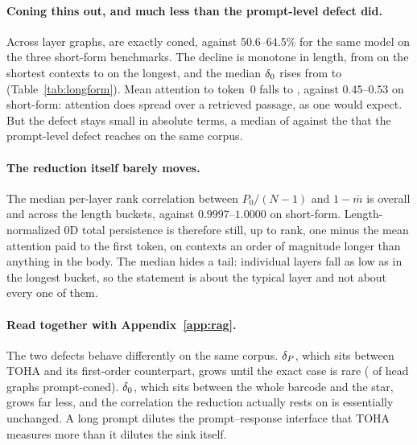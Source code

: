 \paragraph{Coning thins out, and much less than the prompt-level defect did.} Across \LongCells{} layer graphs, \LongConed{} are exactly coned, against \mbox{50.6--64.5\%} for the same model on the three short-form benchmarks. The decline is monotone in length, from \LongConedHi{} on the shortest contexts to \LongConedLo{} on the longest, and the median $\delta_0$ rises from \LongDefectLo{} to \LongDefectHi{} (Table~\ref{tab:longform}). Mean attention to token~0 falls to \LongSink{}, against $0.45$--$0.53$ on short-form: attention does spread over a retrieved passage, as one would expect. But the defect stays small in absolute terms, a median of \LongMedDefect{} against the \RagMedDefect{} that the prompt-level defect reaches on the same corpus.

\paragraph{The reduction itself barely moves.} The median per-layer rank correlation between $P_0/(N{-}1)$ and $1-\bar m$ is \LongRho{} overall and \LongRhoRange{} across the \LongNBuckets{} length buckets, against $0.9997$--$1.0000$ on short-form. Length-normalized $0$D total persistence is therefore still, up to rank, one minus the mean attention paid to the first token, on contexts an order of magnitude longer than anything in the body. The median hides a tail: individual layers fall as low as \LongRhoWorstLayer{} in the longest bucket, so the statement is about the typical layer and not about every one of them.

\paragraph{Read together with Appendix~\ref{app:rag}.} The two defects behave differently on the same corpus. $\delta_P$, which sits between TOHA and its first-order counterpart, grows until the exact case is rare (\RagConed{} of head graphs prompt-coned). $\delta_0$, which sits between the whole barcode and the star, grows far less, and the correlation the reduction actually rests on is essentially unchanged. A long prompt dilutes the prompt--response interface that TOHA measures more than it dilutes the sink itself.

\begin{table}[h]
\centering
\small
\caption{\textbf{Theorem~\ref{thm:cone} on RAGTruth} (\RagModel{}, \LongExamples{} responses, $0$D only). \emph{coned}: share of layer graphs with $\defect_0=0$. $\rho_{/N}$: median over layers of the Spearman correlation across examples between $P_0/(N{-}1)$ and $1-\bar m$. Buckets are by sequence length in tokens; buckets with fewer than 20 examples are omitted.}
\label{tab:longform}
\resizebox{\linewidth}{!}{\SinkTableLongform}
\end{table}

